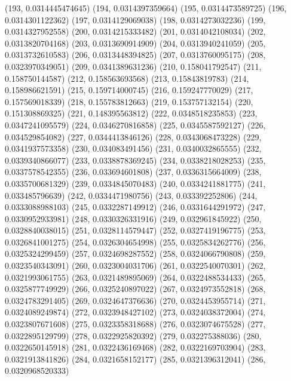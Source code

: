 {					(193, 0.0314445474645)
					(194, 0.0314397359664)
					(195, 0.0314473589725)
					(196, 0.0314301122362)
					(197, 0.0314129069038)
					(198, 0.0314273032236)
					(199, 0.0314327952558)
					(200, 0.0314215333482)
					(201, 0.0314042108034)
					(202, 0.0313820704168)
					(203, 0.0313690914909)
					(204, 0.0313940241059)
					(205, 0.0313732610583)
					(206, 0.0313448394825)
					(207, 0.0313760095175)
					(208, 0.0323970349051)
					(209, 0.0341389631236)
					(210, 0.158041792547)
					(211, 0.158750144587)
					(212, 0.158563693568)
					(213, 0.15843819783)
					(214, 0.158986621591)
					(215, 0.159714000745)
					(216, 0.159247770029)
					(217, 0.157569018339)
					(218, 0.155783812663)
					(219, 0.153757132154)
					(220, 0.151308869325)
					(221, 0.148395563812)
					(222, 0.0348518235853)
					(223, 0.0347241095579)
					(224, 0.0346270816858)
					(225, 0.0345587592127)
					(226, 0.034529854082)
					(227, 0.0344413846126)
					(228, 0.0343068473228)
					(229, 0.0341937573358)
					(230, 0.034083491456)
					(231, 0.0340032865555)
					(232, 0.0339340866077)
					(233, 0.0338878369245)
					(234, 0.0338218028253)
					(235, 0.0337578542355)
					(236, 0.033694601808)
					(237, 0.0336315664009)
					(238, 0.0335700681329)
					(239, 0.0334845070483)
					(240, 0.0334241881775)
					(241, 0.033485796639)
					(242, 0.0334471980756)
					(243, 0.033392252806)
					(244, 0.0333088988103)
					(245, 0.0332287149912)
					(246, 0.0331644291972)
					(247, 0.0330952933981)
					(248, 0.0330326331916)
					(249, 0.032961845922)
					(250, 0.0328840038015)
					(251, 0.0328114579447)
					(252, 0.0327419196775)
					(253, 0.0326841001275)
					(254, 0.0326304654998)
					(255, 0.0325834262776)
					(256, 0.0325324299459)
					(257, 0.0324698287552)
					(258, 0.0324066790808)
					(259, 0.0323540343091)
					(260, 0.0323004031706)
					(261, 0.0322540070301)
					(262, 0.0321993061755)
					(263, 0.0321489895069)
					(264, 0.0322488534433)
					(265, 0.0325877749929)
					(266, 0.0325240897022)
					(267, 0.0324973552818)
					(268, 0.0324783291405)
					(269, 0.0324647376636)
					(270, 0.0324453955714)
					(271, 0.0324089249874)
					(272, 0.0323948427102)
					(273, 0.0324038372004)
					(274, 0.0323807671608)
					(275, 0.0323358318688)
					(276, 0.0323074675528)
					(277, 0.0322895129799)
					(278, 0.0322925820392)
					(279, 0.032275388036)
					(280, 0.0322650145918)
					(281, 0.0322436169468)
					(282, 0.0322169703904)
					(283, 0.0321913841826)
					(284, 0.0321658152177)
					(285, 0.0321396312041)
					(286, 0.0320968520333)
}
